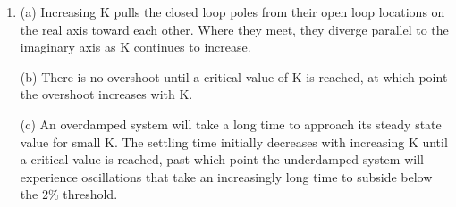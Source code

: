 \documentclass[11pt,a4paper]{article}
\begin{document}
\begin{enumerate}
\item 

(a) Increasing K pulls the closed loop poles from their open loop locations on the real axis toward each other. Where they meet, they diverge parallel to the imaginary axis as K continues to increase.

(b) There is no overshoot until a critical value of K is reached, at which point the overshoot increases with K.

(c) An overdamped system will take a long time to approach its steady state value for small K. The settling time initially decreases with increasing K until a critical value is reached, past which point the underdamped system will experience oscillations that take an increasingly long time to subside below the 2\% threshold.

\end{enumerate}
\end{document}
